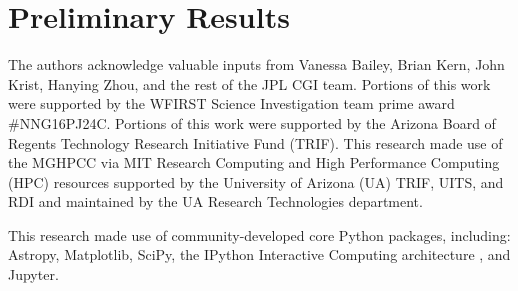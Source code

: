 \documentclass[]{spie}  %
\begin{document}
\section{Preliminary Results}

    
\acknowledgments %


The authors acknowledge valuable inputs from  Vanessa Bailey,  Brian Kern, John Krist, Hanying Zhou,   and the rest of the JPL CGI team.
Portions of this work were supported by the WFIRST Science Investigation team prime award \#NNG16PJ24C.
Portions of this work were supported by the Arizona Board of Regents Technology Research
Initiative Fund (TRIF).
This research made use of the \gls{MGHPCC} via MIT Research Computing and High Performance Computing (HPC) resources supported by the University of Arizona (UA) TRIF, UITS, and RDI and maintained by the UA Research Technologies department.


This research made use of community-developed core Python packages, including: Astropy\cite{the_astropy_collaboration_astropy_2013}, Matplotlib\cite{hunter_matplotlib_2007}, SciPy\cite{jones_scipy_2001}, 
the IPython Interactive Computing architecture \cite{perez_ipython_2007}, and Jupyter\cite{kluyver_jupyter_2016}.
\end{document}
